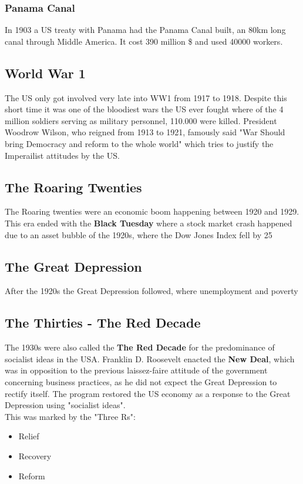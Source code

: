 \documentclass{article}
\begin{document}
	\subsubsection{Panama Canal}
	In 1903 a US treaty with Panama had the Panama Canal built, an 80km long canal through Middle America. It cost 390 million \$ and used 40000 workers. \\
	\subsection{World War 1}
	The US only got involved very late into WW1 from 1917 to 1918. Despite this short time it was one of the bloodiest wars the US ever fought where of the 4 million soldiers serving as military personnel, 110.000 were killed. President Woodrow Wilson, who reigned from 1913 to 1921, famously said "War Should bring Democracy and reform to the whole world" which tries to justify the Imperailist attitudes by the US. \\
	\subsection{The Roaring Twenties}
	The Roaring twenties were an economic boom happening between 1920 and 1929. This era ended with the \textbf{Black Tuesday} where a stock market crash happened due to an asset bubble of the 1920s, where the Dow Jones Index fell by 25%
	\subsection{The Great Depression}
	After the 1920s the Great Depression followed, where unemployment and poverty
	\subsection{The Thirties - The Red Decade}
	The 1930s were also called the \textbf{The Red Decade} for the predominance of socialist ideas in the USA. Franklin D. Roosevelt enacted the \textbf{New Deal}, which was in opposition to the previous laissez-faire attitude of the government concerning business practices, as he did not expect the Great Depression to rectify itself. The program restored the US economy as a response to the Great Depression using "socialist ideas". \\
	This was marked by the "Three Rs":
	\begin{itemize}
		\item{Relief}
		\item{Recovery}
		\item{Reform}
	\end{itemize}
\end{document}
